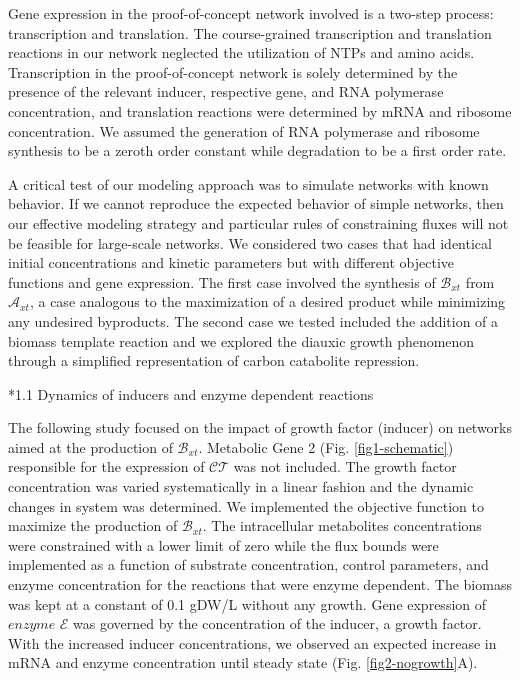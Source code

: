 \documentclass[12pt]{article}
\makeatletter
\renewcommand\subsection{\@startsection
	{subsection}{2}{0mm}
	{-0.05in}
	{-0.5\baselineskip}
	{\normalfont\normalsize\bfseries}}
\makeatother
\begin{document}
Gene expression in the proof-of-concept network involved is a two-step process: transcription and translation. The course-grained transcription and translation reactions in our network neglected the utilization of NTPs and amino acids. Transcription in the proof-of-concept network is solely determined by the presence of the relevant inducer, respective gene, and RNA polymerase concentration, and translation reactions were determined by mRNA and ribosome concentration. We assumed the generation of RNA polymerase and ribosome synthesis to be a zeroth order constant while degradation to be a first order rate. 

A critical test of our modeling approach was to simulate networks with known behavior. If we cannot reproduce the expected behavior of simple networks, then our effective modeling strategy and particular rules of constraining fluxes will not be feasible for large-scale networks. We considered two cases that had identical initial concentrations and kinetic parameters but with different objective functions and gene expression. The first case involved the synthesis of $\mathcal{B}_{xt}$ from $\mathcal{A}_{xt}$, a case analogous to the maximization of a desired product while minimizing any undesired byproducts. The second case we tested included the addition of a biomass template reaction and we explored the diauxic growth phenomenon through a simplified representation of carbon catabolite repression. 

\subsection*{1.1 Dynamics of inducers and enzyme dependent reactions}

The following study focused on the impact of growth factor (inducer) on networks aimed at the production of $\mathcal{B}_{xt}$. Metabolic Gene 2 (Fig. \ref{fig1-schematic}) responsible for the expression of $\mathcal{CT}$ was not included. The growth factor concentration was varied systematically in a linear fashion and the dynamic changes in system was determined. We implemented the objective function to maximize the production of $\mathcal{B}_{xt}$. The intracellular metabolites concentrations were constrained with a lower limit of zero while the flux bounds were implemented as a function of substrate concentration, control parameters, and enzyme concentration for the reactions that were enzyme dependent. The biomass was kept at a constant of 0.1 gDW/L without any growth. Gene expression of $enzyme$ $\mathcal{E}$ was governed by the concentration of the inducer, a growth factor. With the increased inducer concentrations, we observed an expected increase in mRNA and enzyme concentration until steady state (Fig. \ref{fig2-nogrowth}A). 
\end{document}
